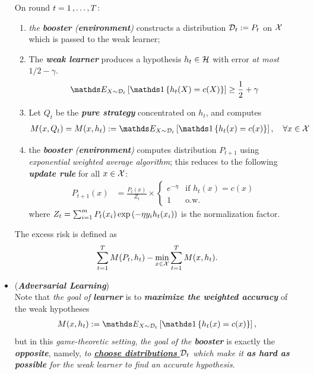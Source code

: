 \documentclass[11pt]{article}
\begin{document}
\begin{itemize}
\begin{remark}
 On round $t = 1 \,{,}\ldots{,}\, T$:
\begin{enumerate}
\item  \emph{the \textbf{booster} (\textbf{environment})} constructs a distribution ${\mathcal D}_t := P_t$ on ${\mathcal X}$ which is passed to the weak learner;
\item The \emph{\textbf{weak learner}} produces a hypothesis $h_t \in {\mathcal H}$ with error \emph{at most}  $1/2 - \gamma$.
\begin{align*}
\E{X\sim\cD_t}{\ind{h_t(X) = c(X)}} \ge \frac{1}{2} + \gamma
\end{align*}
\item Let $Q_t$ be the \textbf{\emph{pure strategy}} concentrated on $h_t$, and computes
\begin{align*}
M(x, Q_t) = M(x, h_t)  := \E{X\sim\cD_t}{\ind{h_t(x) = c(x)}}, \quad \forall x \in \cX
\end{align*}
\item  the \emph{\textbf{booster} (\textbf{environment})} computes distribution $P_{t+1}$ using \emph{exponential weighted average algorithm}; this reduces to the following \emph{\textbf{update rule}} for all $x \in {\mathcal X}$:
\begin{align*}
P_{t+1}(x) &= \frac{P_t(x)}{Z_t} \times \left\{ \begin{array}{cc}
e^{-\eta} &\text{if } h_t(x) = c(x)\\
1 & \text{o.w.}
\end{array}
\right.
\end{align*} where $Z_t = \sum_{i=1}^{m}P_t(x_i)\exp\left( -\eta y_i h_t(x_i)\right)$ is the normalization factor.
\end{enumerate} 
The excess risk is defined as
\begin{align*}
\sum_{t=1}^{T} M(P_t, h_t) - \min_{x \in {\mathcal X}}\sum_{t=1}^{T}M(x, h_t).
\end{align*}
\end{remark}

\item \begin{remark}(\textbf{\emph{Adversarial Learning}})\\
Note that \emph{the goal of \textbf{learner}} is to \emph{\textbf{maximize the weighted accuracy}} of the weak hypotheses
\begin{align*}
M(x, h_t)  := \E{X\sim\cD_t}{\ind{h_t(x) = c(x)}},
\end{align*} but in this \emph{game-theoretic setting}, \emph{the goal of the \textbf{booster}} is exactly the \textbf{\emph{opposite}}, namely, \emph{to \underline{\textbf{choose distributions} ${\mathcal D}_t$} which make it \textbf{as hard as possible} for the weak learner to find an accurate hypothesis}. 
\end{remark}




\end{itemize}
\end{document}
